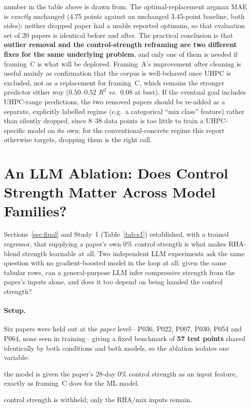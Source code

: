 \documentclass[11pt]{article}
\newcommand{\R}{$R^2$}
\begin{document}
number in the table above is drawn from. The optimal-replacement argmax MAE is
\emph{exactly} unchanged (4.75 points against an unchanged 3.45-point baseline, both
sides): neither dropped paper had a usable reported optimum, so that evaluation set of
20 papers is identical before and after.
The practical conclusion is that \textbf{outlier removal and the control-strength
reframing are two different fixes for the same underlying problem}, and only one of
them is needed if framing~C is what will be deployed. Framing~A's improvement after
cleaning is useful mainly as confirmation that the corpus is well-behaved once UHPC is
excluded, not as a replacement for framing~C, which remains the stronger predictor
either way ($0.50$--$0.52$ \R{} vs.\ $0.08$ at best). If the eventual goal includes UHPC-range
predictions, the two removed papers should be re-added as a separate, explicitly
labelled regime (e.g.\ a categorical ``mix class'' feature) rather than silently
dropped, since 8--38 data points is too little to train a UHPC-specific model on its
own; for the conventional-concrete regime this report otherwise targets, dropping them
is the right call.

\section{An LLM Ablation: Does Control Strength Matter Across Model Families?}
\label{sec:part2-opus}
Sections~\ref{sec:final} and Study~1 (Table~\ref{tab:s1}) established, with a trained
regressor, that supplying a paper's own 0\% control strength is what makes RHA-blend
strength learnable at all. Two independent LLM experiments ask the same question with
no gradient-boosted model in the loop at all: given the same tabular rows, can a
general-purpose LLM infer compressive strength from the paper's inputs alone, and does
it too depend on being handed the control strength?

\paragraph{Setup.} Six papers were held out at the \emph{paper} level---P036, P022,
P007, P030, P054 and P064, none seen in training---giving a fixed benchmark of
\textbf{57 test points} shared identically by both conditions and both models, so the
ablation isolates one variable:
\begin{description}\itemsep2pt
  \item[WITH\_CONTROL] the model is given the paper's 28-day 0\% control strength as an
        input feature, exactly as framing~C does for the ML model.
  \item[NO\_CONTROL] control strength is withheld; only the RHA/mix inputs remain.
\end{description}
\end{document}
